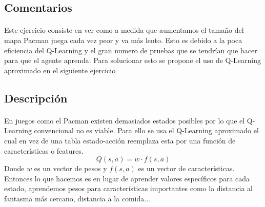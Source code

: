 \documentclass{report}
\begin{document}
      \subsection*{Comentarios}
        \paragraph*{}{
          Este ejercicio consiste en ver como a medida que aumentamos el tamaño del mapa Pacman juega cada vez peor y va más lento.
          Esto es debido a la poca eficiencia del Q-Learning y el gran numero de pruebas que se tendrían que hacer para que el agente aprenda.
          Para solucionar esto se propone el uso de Q-Learning aproximado en el siguiente ejercicio
        }
      \subsection*{Descripción}
        \paragraph*{}
        {
          En juegos como el Pacman existen demasiados estados posibles por lo que el Q-Learning convencional no es viable.
          Para ello se usa el Q-Learning aproximado el cual en vez de una tabla estado-acción reemplaza esta por una función de características o features.
          \[ Q(s,a) = w \cdot f(s,a) \]
          Donde \(w\) es un vector de pesos y \(f(s,a)\) es un vector de características.
          Entonces lo que hacemos es en lugar de aprender valores específicos para cada estado, aprendemos pesos para características importantes como la distancia al fantasma más cercano, distancia a la comida...
        }
\end{document}
